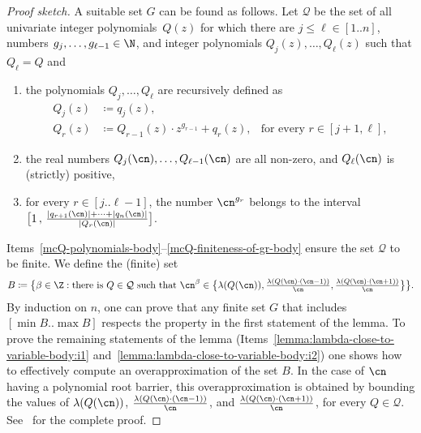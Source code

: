 \begin{proof}[Proof sketch]
  A suitable set $G$ can be found as follows. Let $\mathcal{Q}$ be the set of
  all univariate integer polynomials~$Q(z)$ for which there are $j \leq \ell \in
  [1..n]$, numbers $g_j,\dots,g_{\ell-1} \in \N$, and integer polynomials
  $Q_j(z),\dots,Q_{\ell}(z)$ such that $Q_\ell = Q$ and
    \begin{enumerate}
      \item\label{mcQ-polynomials-body} the polynomials $Q_j,\dots,Q_\ell$
      are recursively defined as 
          \begin{align*}
          Q_j(z) & \coloneqq q_j(z),                                  \\
          Q_r(z) & \coloneqq Q_{r-1}(z) \cdot z^{g_{r-1}} + q_{r}(z),
              & \text{for every } r \in [j+1,\ell],
          \end{align*}
      \item
      the real numbers $Q_j(\cn),\dots,Q_{\ell-1}(\cn)$ are all non-zero, and
      $Q_\ell(\cn)$ is (strictly) positive,
      \item\label{mcQ-finiteness-of-gr-body} for every $r \in [j..\ell-1]$, 
      the number $\cn^{g_r}$ belongs to the interval
      $\big[1\,,\,\frac{\abs{q_{r+1}(\cn)}+\dots+\abs{q_n(\cn)}}{\abs{Q_r(\cn)}}\big]$.
    \end{enumerate}
  Items~\ref{mcQ-polynomials-body}--\ref{mcQ-finiteness-of-gr-body} ensure the
  set $\mathcal{Q}$ to be finite. We define the (finite) set
  \[ 
    B \coloneqq \big\{ \beta \in \Z : \text{there is } Q \in \mathcal{Q} \text{ such that } \cn^{\beta} \in \big\{{\textstyle\lambda(Q(\cn)), \frac{\lambda(Q(\cn) \cdot (\cn-1))}{\cn}, \frac{\lambda(Q(\cn) \cdot (\cn+1))}{\cn}}\big\}
    \big\}.
  \]
  By induction on $n$, one can prove that any finite set $G$ that includes
  $[\min B.. \max B]$ respects the property in the first statement of the lemma.
  To prove the remaining statements of the lemma 
  (Items~\eqref{lemma:lambda-close-to-variable-body:i1} 
  and~\eqref{lemma:lambda-close-to-variable-body:i2}) 
  one shows how to effectively compute an overapproximation
  of the set $B$. In the case of $\cn$ having a polynomial root barrier, 
  this overapproximation is obtained by bounding the values of
  $\textstyle\lambda(Q(\cn))$, $\frac{\lambda(Q(\cn) \cdot (\cn-1))}{\cn}$, and
  $\frac{\lambda(Q(\cn) \cdot (\cn+1))}{\cn}$, for every $Q \in \mathcal{Q}$.
  See~ for the complete proof.
\end{proof}


